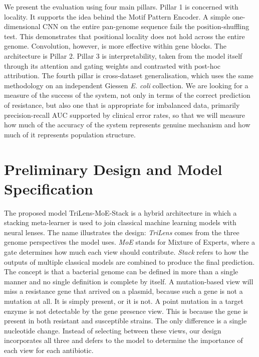 We present the evaluation using four main pillars. Pillar 1 is concerned with locality. It supports the idea behind the Motif Pattern Encoder. A simple one-dimensional CNN on the entire pan-genome sequence fails the position-shuffling test. This demonstrates that positional locality does not hold across the entire genome. Convolution, however, is more effective within gene blocks. The architecture is Pillar 2. Pillar 3 is interpretability, taken from the model itself through its attention and gating weights and contrasted with post-hoc attribution. The fourth pillar is cross-dataset generalisation, which uses the same methodology on an independent Giessen \textit{E. coli} collection. We are looking for a measure of the success of the system, not only in terms of the correct prediction of resistance, but also one that is appropriate for imbalanced data, primarily precision-recall AUC supported by clinical error rates, so that we will measure how much of the accuracy of the system represents genuine mechanism and how much of it represents population structure.


\FloatBarrier
\section{Preliminary Design and Model Specification}
\label{sec:architecture}

The proposed model TriLens-MoE-Stack is a hybrid architecture in which a stacking meta-learner
is used to join classical machine learning models with neural lenses. The name illustrates the
design: \textit{TriLens} comes from the three genome perspectives the model uses. \textit{MoE} stands
for Mixture of Experts, where a gate determines how much each view should contribute.
\textit{Stack} refers to how the outputs of multiple classical models are combined to produce
the final prediction. The concept is that a bacterial genome can be defined in more
than a single manner and no single definition is complete by itself. A mutation-based view
will miss a resistance gene that arrived on a plasmid, because such a gene is not a mutation at
all. It is simply present, or it is not. A point mutation in a target enzyme is not detectable by the gene presence view. This is
because the gene is present in both resistant and susceptible strains. The only difference is
a single nucleotide change. Instead of selecting between these views, our design incorporates all three and defers to the
model to determine the importance of each view for each antibiotic.


